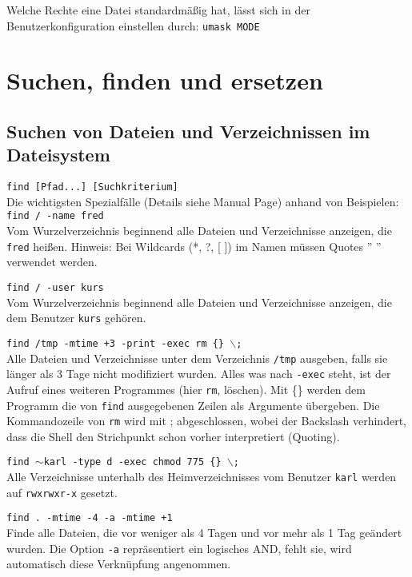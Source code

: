 \documentclass[11pt]{article}
\begin{document}
Welche Rechte eine Datei standardmäßig hat, lässt sich in der
Benutzerkonfiguration einstellen durch:
\texttt{umask MODE}

\section{Suchen, finden und ersetzen}
\subsection{Suchen von Dateien und Verzeichnissen im Dateisystem}
\texttt{find [Pfad...] [Suchkriterium]}\\

Die wichtigsten Spezialfälle (Details siehe Manual Page) anhand
von Beispielen:\\

\texttt{find / -name fred} \\
Vom Wurzelverzeichnis beginnend alle Dateien und Verzeichnisse
anzeigen, die \texttt{fred} heißen. Hinweis: Bei Wildcards (*, ?, [ ])
im Namen müssen Quotes '' '' verwendet werden.

\texttt{find / -user kurs} \\
Vom Wurzelverzeichnis beginnend alle Dateien und Verzeichnisse
anzeigen, die dem Benutzer \texttt{kurs} gehören.

\texttt{find /tmp -mtime +3 -print -exec rm \{\} $\backslash$;} \\
Alle Dateien und Verzeichnisse unter dem Verzeichnis \texttt{/tmp}
ausgeben, falls sie länger als 3 Tage nicht modifiziert wurden.
Alles was nach \texttt{-exec} steht, ist der Aufruf eines weiteren
Programmes (hier \texttt{rm}, löschen). Mit \{\} werden dem Programm
die von \texttt{find} ausgegebenen Zeilen als Argumente übergeben. Die
Kommandozeile von \texttt{rm} wird mit ; abgeschlossen, wobei der
Backslash verhindert, dass die Shell den Strichpunkt schon vorher
interpretiert (Quoting).

\texttt{find $\sim$karl -type d -exec chmod 775 \{\} $\backslash$;} \\
Alle Verzeichnisse unterhalb des Heimverzeichnisses vom Benutzer
\texttt{karl} werden auf \texttt{rwxrwxr-x} gesetzt.

\texttt{find . -mtime -4 -a -mtime +1} \\
Finde alle Dateien, die vor weniger als 4 Tagen  und vor mehr als 1 Tag geändert wurden. Die Option \texttt{-a} repräsentiert ein logisches AND, fehlt sie, wird automatisch diese Verknüpfung angenommen.
\end{document}
